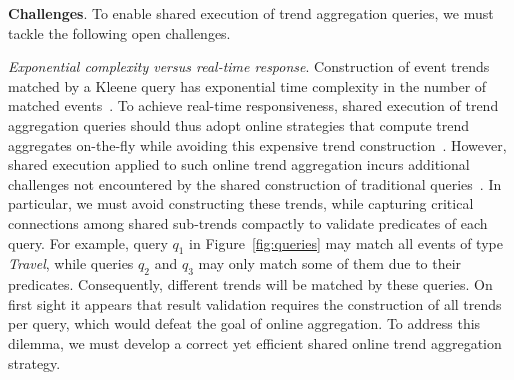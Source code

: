 
\textbf{Challenges}. To enable shared execution of trend aggregation queries, we must tackle the following open challenges. 


\textit{Exponential complexity versus real-time response}.
Construction of event trends matched by a Kleene query has exponential time complexity in the number of matched events~\cite{PLAR17,ZDI14}. To achieve real-time responsiveness, shared execution of trend aggregation queries should thus adopt online strategies that compute trend aggregates on-the-fly while avoiding this expensive trend construction~\cite{PLRM18,PLRM19}. However, shared execution applied to such online trend aggregation incurs additional challenges not encountered by the shared construction of traditional queries~\cite{KS19}. In particular, we must avoid constructing these trends, while  capturing  critical connections among shared sub-trends compactly to validate predicates of each query. 
%
For example, query $q_1$ in Figure~\ref{fig:queries} may match all events of type \textit{Travel}, while queries $q_2$ and $q_3$ may only match some of them due to their predicates. Consequently, different trends will be matched by these queries.
%
On first sight it appears that result validation requires the construction of all trends per query, which would defeat the goal of online aggregation. To address this dilemma, we must  develop  a correct yet efficient shared online trend aggregation strategy.


